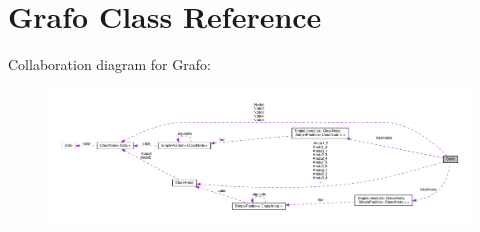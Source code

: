 \hypertarget{class_grafo}{}\section{Grafo Class Reference}
\label{class_grafo}


Collaboration diagram for Grafo\+:
\nopagebreak
\begin{figure}[H]
\begin{center}
\leavevmode
\includegraphics[width=350pt]{class_grafo__coll__graph}
\end{center}
\end{figure}
